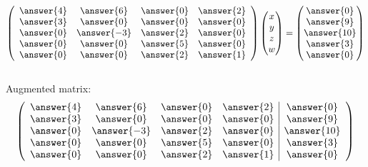 \documentclass{ximera}
\begin{document}
\begin{exercise}
\begin{prompt}
\begin{equation*}
\left(\begin{array}{cccc}
\answer{4} & \answer{6} &\answer{0} & \answer{2}\\
\answer{3} & \answer{0} &\answer{0} & \answer{0}\\
\answer{0} & \answer{-3} &\answer{2} & \answer{0}\\
\answer{0} & \answer{0} &\answer{5} & \answer{0}\\
\answer{0} & \answer{0} &\answer{2} & \answer{1}
\end{array}\right)\begin{pmatrix}
x \\
y\\
z\\
w
\end{pmatrix}
 =
 \begin{pmatrix}
 \answer{0}\\
 \answer{9}\\
 \answer{10}\\
 \answer{3}\\
 \answer{0}
 \end{pmatrix}
 \end{equation*}\\

 Augmented matrix:
 \begin{equation*}
 \left(\begin{array}{cccc|c}
 \answer{4} & \answer{6} &\answer{0} & \answer{2} & \answer{0}\\
 \answer{3} & \answer{0} &\answer{0} & \answer{0} & \answer{9}\\
\answer{0} & \answer{-3} &\answer{2} & \answer{0} & \answer{10}\\
\answer{0} & \answer{0} &\answer{5} & \answer{0} & \answer{3}\\
\answer{0} & \answer{0} &\answer{2} & \answer{1} & \answer{0}
\end{array}\right)
\end{equation*}
\end{prompt}




















\end{exercise}
\end{document}
